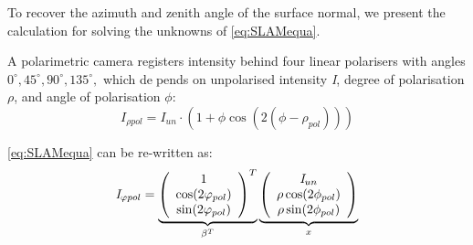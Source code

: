 \documentclass[10pt,twocolumn,letterpaper]{article}
\begin{document}
To recover the azimuth and zenith angle of the surface
normal, we present the calculation for solving the unknowns
of \cref{eq:SLAMequa}.

A polarimetric camera registers intensity behind four linear polarisers with angles $0^\circ, 45^\circ, 90^\circ, 135^\circ,$ which depends on unpolarised intensity \textit{I}, degree of polarisation $\rho$, and angle of polarisation $\phi$:
\begin{equation}
    \textit{I}_{\rho pol} = \textit{I}_{un} \cdot (1 + \phi\cos(2(\phi - \rho_{pol})))
    \label{eq:SLAMequa}
\end{equation}

\cref{eq:SLAMequa} can be re-written as:
\begin{equation}
    \textit{I}_{ \varphi pol} = \underbrace{\left(\begin{array}{c c c} 
                                                1\\
                                                \cos(2 \varphi_{pol})\\ 
                                                \sin(2 \varphi_{pol}) 
                                                \end{array}
                                                \right)^T}_{\beta^{T}}\underbrace{\left(\begin{array}{c c c} 
                                                \textit{I}_{un}\\
                                                \rho\cos(2\phi_{pol})\\ 
                                                \rho\sin(2\phi_{pol}) 
                                                \end{array}
                                                \right)}_{x}
    \label{eq:SLAMequa}
\end{equation}


{\small


}
\end{document}
